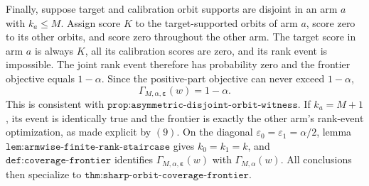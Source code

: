 Finally, suppose target and calibration orbit supports are disjoint in an arm \(a\) with \(k_a\le M\). Assign score \(K\) to the target-supported orbits of arm \(a\), score zero to its other orbits, and score zero throughout the other arm. The target score in arm \(a\) is always \(K\), all its calibration scores are zero, and its rank event is impossible. The joint rank event therefore has probability zero and the frontier objective equals \(1-\alpha\). Since the positive-part objective can never exceed \(1-\alpha\),
\[
\Gamma_{M,\alpha,\boldsymbol\varepsilon}(w)=1-\alpha.
\]
This is consistent with \(\texttt{prop:asymmetric-disjoint-orbit-witness}\). If \(k_a=M+1\), its event is identically true and the frontier is exactly the other arm's rank-event optimization, as made explicit by \((9)\). On the diagonal \(\varepsilon_0=\varepsilon_1=\alpha/2\), lemma \(\texttt{lem:armwise-finite-rank-staircase}\) gives \(k_0=k_1=k\), and \(\texttt{def:coverage-frontier}\) identifies \(\Gamma_{M,\alpha,\boldsymbol\varepsilon}(w)\) with \(\Gamma_{M,\alpha}(w)\). All conclusions then specialize to \(\texttt{thm:sharp-orbit-coverage-frontier}\).